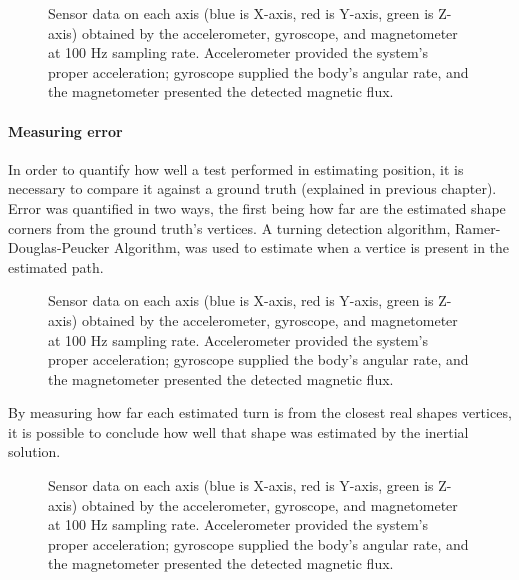 \begin{figure}
    \centering
    \resizebox{1\linewidth}{!}{}
    \caption{Sensor data on each axis (blue is X-axis, red is Y-axis, green is Z-axis) obtained by the accelerometer, gyroscope, and magnetometer at 100 Hz sampling rate. Accelerometer provided the system's proper acceleration; gyroscope supplied the body's angular rate, and the magnetometer presented the detected magnetic flux.}
    \label{fig:square}
\end{figure}

\paragraph{Measuring error}

In order to quantify how well a test performed in estimating position, it is necessary to compare it against a ground truth (explained in previous chapter). Error was quantified in two ways, the first being how far are the estimated shape corners from the ground truth's vertices. A turning detection algorithm, Ramer-Douglas-Peucker Algorithm, was used to estimate when a vertice is present in the estimated path.

\begin{figure}
    \centering
    \resizebox{1\linewidth}{!}{}
    \caption{Sensor data on each axis (blue is X-axis, red is Y-axis, green is Z-axis) obtained by the accelerometer, gyroscope, and magnetometer at 100 Hz sampling rate. Accelerometer provided the system's proper acceleration; gyroscope supplied the body's angular rate, and the magnetometer presented the detected magnetic flux.}
    \label{fig:square_truth}
\end{figure}

By measuring how far each estimated turn is from the closest real shapes vertices, it is possible to conclude how well that shape was estimated by the inertial solution.

\begin{figure}
    \centering
    \resizebox{1\linewidth}{!}{}
    \caption{Sensor data on each axis (blue is X-axis, red is Y-axis, green is Z-axis) obtained by the accelerometer, gyroscope, and magnetometer at 100 Hz sampling rate. Accelerometer provided the system's proper acceleration; gyroscope supplied the body's angular rate, and the magnetometer presented the detected magnetic flux.}
    \label{fig:square}
\end{figure}

